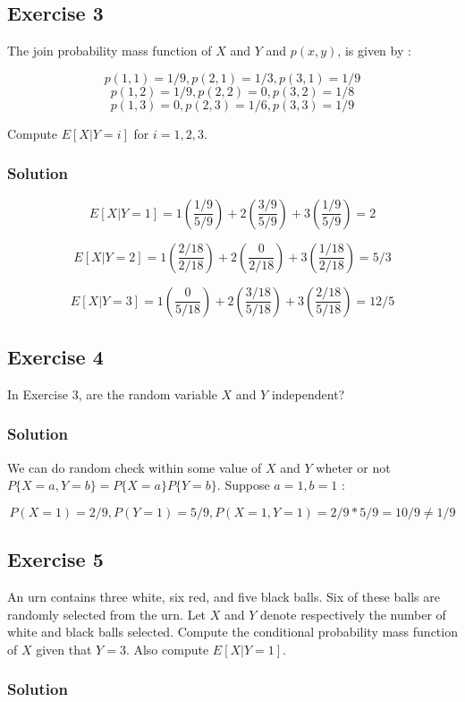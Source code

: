 \documentclass[12pt,a4paper]{article}
\begin{document}
\subsection{Exercise 3}
The join probability mass function of $X$ and $Y$ and $p(x,y)$, is given by :

\[
p(1,1) = 1/9, p(2,1) = 1/3, p(3,1) = 1/9
\]
\[
p(1,2) = 1/9, p(2,2) = 0, p(3,2) = 1/8
\]
\[
p(1,3) = 0, p(2,3) = 1/6, p(3,3) = 1/9
\]

Compute $E[X|Y=i]$ for $i=1,2,3$.

\subsubsection{Solution}

\[
E[X|Y=1] = 1(\frac{1/9}{5/9}) + 2(\frac{3/9}{5/9}) + 3(\frac{1/9}{5/9}) =  2
\]

\[
E[X|Y=2] = 1(\frac{2/18}{2/18}) + 2(\frac{0}{2/18}) + 3(\frac{1/18}{2/18}) = 5/3
\]

\[
E[X|Y=3] = 1(\frac{0}{5/18}) + 2(\frac{3/18}{5/18}) + 3(\frac{2/18}{5/18}) = 12/5
\]


\subsection{Exercise 4}

In Exercise 3, are the random variable $X$ and $Y$ independent?

\subsubsection{Solution}

We can do random check within some value of $X$ and $Y$ wheter or not $P\{X=a,Y=b\} = P\{X=a\} P\{Y=b\}$. Suppose $a=1, b=1$ :

\[
P(X=1) = 2/9, P(Y=1) = 5/9, P(X=1, Y=1) = 2/9 * 5/9 = 10/9 \neq 1/9
\]

\subsection{Exercise 5}

An urn contains three white, six red, and five black balls. Six of these balls are randomly selected from the urn. Let $X$ and $Y$ denote respectively the number of white and black balls selected. Compute the conditional probability mass function of $X$ given that $Y=3$. Also compute $E[X|Y=1]$.

\subsubsection{Solution}
\end{document}

